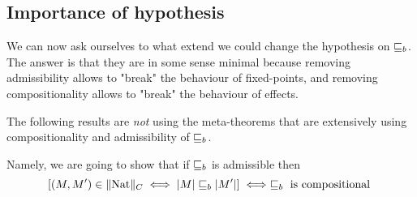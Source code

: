 \subsection{Importance of hypothesis}

We can now ask ourselves to what extend we could change 
the hypothesis on $\sqsubseteq_b$. The answer is that they 
are in some sense minimal because removing admissibility 
allows to "break" the behaviour of fixed-points, and 
removing compositionality allows to "break" the 
behaviour of effects.

The following results are \emph{not} using the meta-theorems 
that are extensively using compositionality and admissibility 
of $\sqsubseteq_b$.

\begin{alemma}
    Namely, we are going to show that if $\sqsubseteq_b$ is admissible then 
    \begin{equation*}
        \left[(M,M') \in \| \textnormal{Nat} \|_C \iff
        |M| \sqsubseteq_b |M'| \right]
        \iff
        \sqsubseteq_b \text{ is compositional }
    \end{equation*}
\end{alemma}

